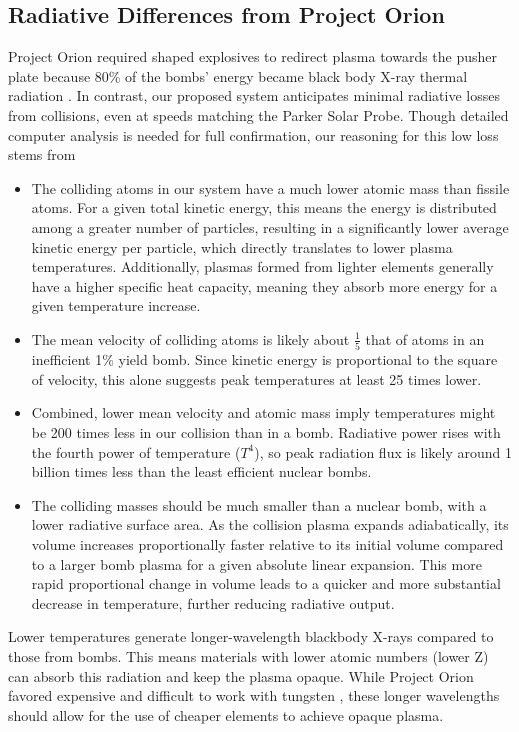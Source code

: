 \documentclass{article}
\begin{document}
{\subsection{Radiative Differences from Project Orion}
Project Orion required shaped explosives to redirect plasma towards the pusher plate because 80\% of the bombs' energy became black body X-ray thermal radiation \cite{toughsf_cassaba_howitzer}.  In contrast, our proposed system anticipates minimal radiative losses from collisions, even at speeds matching the Parker Solar Probe. Though detailed computer analysis is needed for full confirmation, our reasoning for this low loss stems from
\begin{itemize}
    \item The colliding atoms in our system have a much lower atomic mass than fissile atoms. For a given total kinetic energy, this means the energy is distributed among a greater number of particles, resulting in a significantly lower average kinetic energy per particle, which directly translates to lower plasma temperatures. Additionally, plasmas formed from lighter elements generally have a higher specific heat capacity, meaning they absorb more energy for a given temperature increase. 
    \item The mean velocity of colliding atoms is likely about $\frac{1}{5}$ that of atoms in an inefficient 1\% yield bomb.  Since kinetic energy is proportional to the square of velocity, this alone suggests peak temperatures at least 25 times lower.
    \item Combined, lower mean velocity and atomic mass imply temperatures might be 200 times less in our collision than in a bomb.  Radiative power rises with the fourth power of temperature ($T^4$), so peak radiation flux is likely around 1 billion times less than the least efficient nuclear bombs.
    \item The colliding masses should be much smaller than a nuclear bomb, with a lower radiative surface area.   As the collision plasma expands adiabatically, its volume increases proportionally faster relative to its initial volume compared to a larger bomb plasma for a given absolute linear expansion. This more rapid proportional change in volume leads to a quicker and more substantial decrease in temperature, further reducing radiative output.
\end{itemize}

Lower temperatures generate longer-wavelength blackbody X-rays compared to those from bombs. This means materials with lower atomic numbers (lower Z) can absorb this radiation and keep the plasma opaque. While Project Orion favored expensive and difficult to work with tungsten \cite{toughsf_cassaba_howitzer}, these longer wavelengths should allow for the use of cheaper elements to achieve opaque plasma.

}
\end{document}
